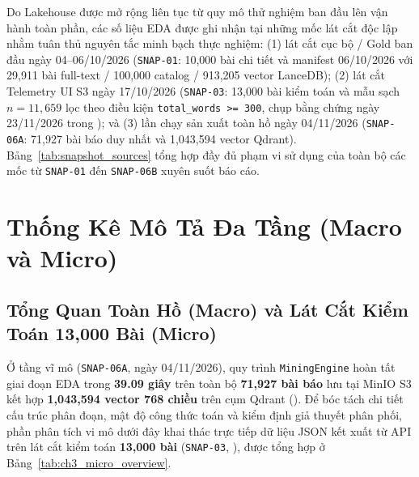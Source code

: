 Do Lakehouse được mở rộng liên tục từ quy mô thử nghiệm ban đầu lên vận hành toàn phần, các số liệu EDA được ghi nhận tại những mốc lát cắt độc lập nhằm tuân thủ nguyên tắc minh bạch thực nghiệm: (1) lát cắt cục bộ / Gold ban đầu ngày 04--06/10/2026 (\texttt{SNAP-01}: 10,000 bài chi tiết và manifest 06/10/2026 với 29,911 bài full-text / 100,000 catalog / 913,205 vector LanceDB); (2) lát cắt Telemetry UI S3 ngày 17/10/2026 (\texttt{SNAP-03}: 13,000 bài kiểm toán và mẫu sạch $n = 11,659$ lọc theo điều kiện \texttt{total\_words >= 300}, chụp bằng chứng ngày 23/11/2026 trong ); và (3) lần chạy sản xuất toàn hồ ngày 04/11/2026 (\texttt{SNAP-06A}: 71,927 bài báo duy nhất và 1,043,594 vector Qdrant). Bảng~\ref{tab:snapshot_sources} tổng hợp đầy đủ phạm vi sử dụng của toàn bộ các mốc từ \texttt{SNAP-01} đến \texttt{SNAP-06B} xuyên suốt báo cáo.



\FloatBarrier
\section{Thống Kê Mô Tả Đa Tầng (Macro và Micro)}
\label{sec:ch3_descriptive_stats}

\subsection{Tổng Quan Toàn Hồ (Macro) và Lát Cắt Kiểm Toán 13,000 Bài (Micro)}
\label{sec:ch3_macro_micro}

Ở tầng vĩ mô (\texttt{SNAP-06A}, ngày 04/11/2026), quy trình \texttt{MiningEngine} hoàn tất giai đoạn EDA trong \textbf{39.09 giây} trên toàn bộ \textbf{71,927 bài báo} lưu tại MinIO S3 kết hợp \textbf{1,043,594 vector 768 chiều} trên cụm Qdrant  (). Để bóc tách chi tiết cấu trúc phân đoạn, mật độ công thức toán và kiểm định giả thuyết phân phối, phần phân tích vi mô dưới đây khai thác trực tiếp dữ liệu JSON kết xuất từ API  trên lát cắt kiểm toán \textbf{13,000 bài} (\texttt{SNAP-03}, ), được tổng hợp ở Bảng~\ref{tab:ch3_micro_overview}.

